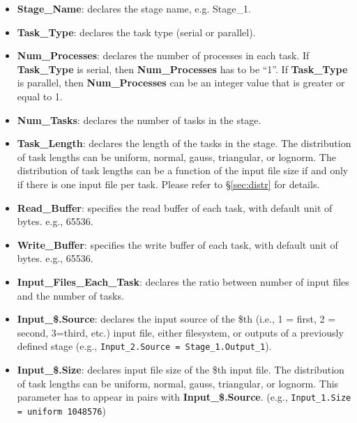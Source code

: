 \documentclass[10pt,a4paper]{article}
\begin{document}
\begin{itemize}

\item{\textbf{Stage\_Name}:} declares the stage name, e.g. Stage\_1.

\item{\textbf{Task\_Type}:} declares the task type (serial or parallel).

\item{\textbf{Num\_Processes}:} declares the number of processes in each task. If \textbf{Task\_Type} is serial, then \textbf{Num\_Processes} has to be ``1''. If \textbf{Task\_Type} is parallel, then \textbf{Num\_Processes} can be an integer value that is greater or equal to 1.

\item{\textbf{Num\_Tasks}:} declares the number of tasks in the stage.

\item{\textbf{Task\_Length}:} declares the length of the tasks in the stage. The distribution of task lengths can be uniform, normal, gauss, triangular, or lognorm. The distribution of task lengths can be a function of the input file size if and only if there is one input file per task. Please refer to \S\ref{sec:distr} for details.

\item{\textbf{Read\_Buffer}:} specifies the read buffer of each task, with default unit of bytes. e.g., 65536.

\item{\textbf{Write\_Buffer}:} specifies the write buffer of each task, with default unit of bytes. e.g., 65536.

\item{\textbf{Input\_Files\_Each\_Task}:} declares the ratio between number of input files and the number of tasks.


\item{\textbf{Input\_\$.Source}:} declares the input source of the \$th (i.e., 1 = first, 2 = second, 3=third, etc.) input file, either filesystem, or outputs of a previously defined stage (e.g., {\tt Input\_2.Source = Stage\_1.Output\_1}). 

\item{\textbf{Input\_\$.Size}:}  declares input file size of the  \$th input file. The distribution of task lengths can be uniform, normal, gauss, triangular, or lognorm. This parameter has to appear in pairs with \textbf{Input\_\$.Source}. (e.g., {\tt Input\_1.Size = uniform 1048576})


\end{itemize}
\end{document}
